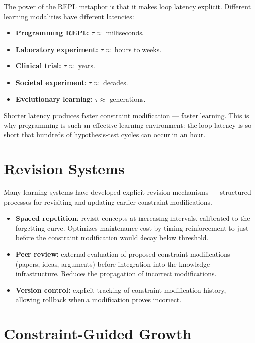 The power of the REPL metaphor is that it makes loop latency explicit.
Different learning modalities have different latencies:

\begin{itemize}
  \item \textbf{Programming REPL:} $\tau \approx$ milliseconds.
  \item \textbf{Laboratory experiment:} $\tau \approx$ hours to weeks.
  \item \textbf{Clinical trial:} $\tau \approx$ years.
  \item \textbf{Societal experiment:} $\tau \approx$ decades.
  \item \textbf{Evolutionary learning:} $\tau \approx$ generations.
\end{itemize}

Shorter latency produces faster constraint modification — faster learning.
This is why programming is such an effective learning environment:
the loop latency is so short that hundreds of hypothesis-test cycles
can occur in an hour.

\section{Revision Systems}

Many learning systems have developed explicit revision mechanisms —
structured processes for revisiting and updating earlier constraint
modifications.

\begin{itemize}
  \item \textbf{Spaced repetition:} revisit concepts at increasing
        intervals, calibrated to the forgetting curve. Optimizes
        maintenance cost by timing reinforcement to just before
        the constraint modification would decay below threshold.
  \item \textbf{Peer review:} external evaluation of proposed
        constraint modifications (papers, ideas, arguments) before
        integration into the knowledge infrastructure. Reduces
        the propagation of incorrect modifications.
  \item \textbf{Version control:} explicit tracking of constraint
        modification history, allowing rollback when a modification
        proves incorrect.
\end{itemize}

\section{Constraint-Guided Growth}

